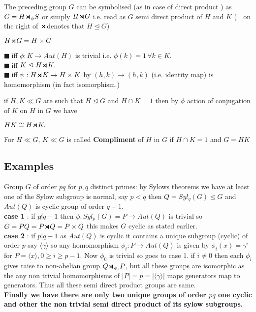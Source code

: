\documentclass[11pt]{extarticle}
\newcommand{\ra}{\rightarrow}
\newcommand{\snote}[1]{{\footnotesize(#1)}}
\newcommand{\y}{$\blacksquare\;$}
\newcommand{\smdp}{ \,
\begin{tikzpicture}
	\draw[thick] (0,0)--(1ex,1ex)--(1ex,0)--(0,1ex);
\end{tikzpicture} 
\,
}
\newcommand{\gen}[1]{\langle #1 \rangle}
\newcommand{\tbx}[2][]{
	\begin{tcolorbox}[enhanced,breakable,size=small,colback=black!2!white,title={#1},arc is angular, arc=1.5mm,drop fuzzy shadow]
		#2
	\end{tcolorbox}
}
\begin{document}
\begin{multicols}{2}
{		
	}
	\tbx{The preceding group $ G $ can be symbolised (as in case of direct product ) as $ G = H \smdp _\phi S $ or simply $ H \smdp G $ i.e. read as 
		$ G $ semi direct product of $ H $ and $ K $ \snote{ {\small | } on the right of $ \smdp $denotes that $ H \trianglelefteq G $}
	}
	\tbx{$ H \smdp G = H \times G $
		
		\y  iff $ \phi : K \ra Aut(H) $ is trivial i.e. $ \phi(k)=1 \, \forall k \in K.$  \\
		\y  iff $ K \trianglelefteq H\smdp K .$ \\
		\y  iff $ \psi : H\smdp K \ra H\times K  $ by $ (h,k) \ra (h,k) $ (i.e. identity map) is homomorphism (in fact isomorphism.) 
		
		
	}
	\tbx[Recognition Theorem of Semi Direct product]{ if $ H,K \ll G $ are such that $ H\trianglelefteq G $ and $ H \cap K =1 $ then by $ \phi  $ action of conjugation of  $ K $ on $ H $ in $ G $ we have 
		\begin{center}
			$ HK\cong H \smdp K .$
		\end{center}
	}
	\tbx{For $ H\ll G $, $ K \ll G $ is called \textbf{Compliment } of $ H $ in $ G $ if $ H\cap K =1 $ and $ G=HK $
	}
	\subsection{Examples}
	\tbx{
		Group $ G $ of order $ pq $  for $ p,q $ distinct primes: by Sylows theorems we have at least one of the Sylow subgroup is normal, say $ p<q $ then $ Q= Syl_q(G) \trianglelefteq G$ and $ Aut(Q) $ is cyclic group of order $ q-1 .$\\
		\textbf{case 1} : if $ p\not|q-1 $ then $ \phi :  Syl_p(G)=P\ra Aut(Q)$ is trivial so $ G= PQ=P\smdp Q = P \times Q $ this makes $ G $ cyclic as stated earlier.\\
		\textbf{case 2} : if $ p|q-1 $ as $ Aut(Q) $ is cyclic it contains a unique subgroup (cyclic) of order $ p $ say 
		$ \gen{\gamma }$ so any homomorphism $ \phi_i : P \ra Aut(Q)  $ is given by $ \phi_i(x)=\gamma^i $ for $ P=\gen{x}, 0\geq i \geq p-1 $. Now $ \phi_0 $ is trivial so goes to case 1. if $ i\neq 0 $ then each $ \phi_i $ gives raise to non-abelian group $ Q \smdp_{\phi_i} P $, but all these groups are isomorphic as the  any non trivial homomorphisms of $ |P|=p = |\gen{\gamma}|$ maps generators map to generators. Thus all these semi direct product groups are same.\\
		\textbf{Finally we  have there are only two unique groups of order $ pq $ one cyclic and other the non trivial semi direct product of its sylow subgroups.}}
	

\end{multicols}
\end{document}
